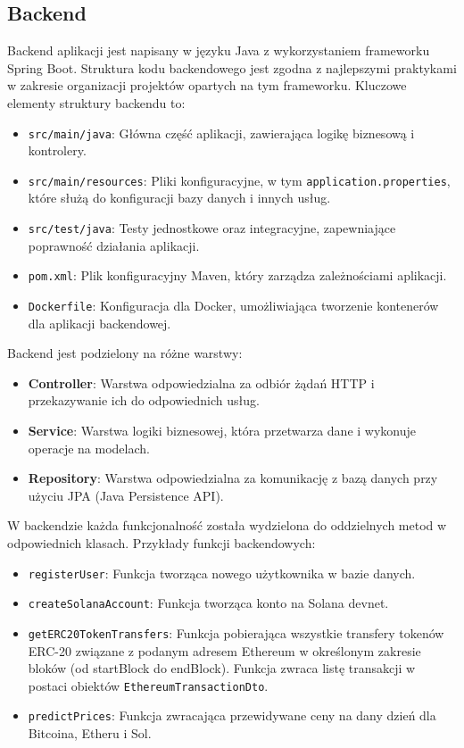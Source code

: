 \subsection{Backend}
Backend aplikacji jest napisany w języku Java z wykorzystaniem frameworku Spring Boot. Struktura kodu backendowego jest zgodna z najlepszymi praktykami w zakresie organizacji projektów opartych na tym frameworku. Kluczowe elementy struktury backendu to:
\begin{itemize}
    \item \texttt{src/main/java}: Główna część aplikacji, zawierająca logikę biznesową i kontrolery.
    \item \texttt{src/main/resources}: Pliki konfiguracyjne, w tym \texttt{application.properties}, które służą do konfiguracji bazy danych i innych usług.
    \item \texttt{src/test/java}: Testy jednostkowe oraz integracyjne, zapewniające poprawność działania aplikacji.
    \item \texttt{pom.xml}: Plik konfiguracyjny Maven, który zarządza zależnościami aplikacji.
    \item \texttt{Dockerfile}: Konfiguracja dla Docker, umożliwiająca tworzenie kontenerów dla aplikacji backendowej.
\end{itemize}

\noindent Backend jest podzielony na różne warstwy:
\begin{itemize}
    \item \textbf{Controller}: Warstwa odpowiedzialna za odbiór żądań HTTP i przekazywanie ich do odpowiednich usług.
    \item \textbf{Service}: Warstwa logiki biznesowej, która przetwarza dane i wykonuje operacje na modelach.
    \item \textbf{Repository}: Warstwa odpowiedzialna za komunikację z bazą danych przy użyciu JPA (Java Persistence API).
\end{itemize}
W backendzie każda funkcjonalność została wydzielona do oddzielnych metod w odpowiednich klasach. Przykłady funkcji backendowych:
\begin{itemize}
    \item \texttt{registerUser}: Funkcja tworząca nowego użytkownika w bazie danych.
    \item \texttt{createSolanaAccount}: Funkcja tworząca konto na Solana devnet.
    \item \texttt{getERC20TokenTransfers}: Funkcja pobierająca wszystkie transfery tokenów ERC-20 związane z podanym adresem Ethereum w określonym zakresie bloków (od startBlock do endBlock). Funkcja zwraca listę transakcji w postaci obiektów \texttt{EthereumTransactionDto}.
		\item \texttt{predictPrices}: Funkcja zwracająca przewidywane ceny na dany dzień dla Bitcoina, Etheru i Sol.
\end{itemize}


